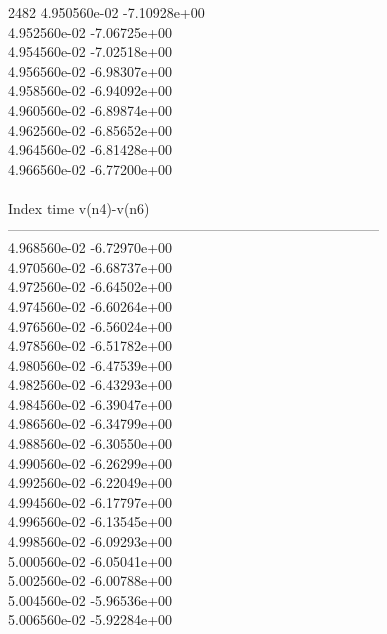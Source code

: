 2482	4.950560e-02	-7.10928e+00	\\ 	4.952560e-02	-7.06725e+00	\\ 	4.954560e-02	-7.02518e+00	\\ 	4.956560e-02	-6.98307e+00	\\ 	4.958560e-02	-6.94092e+00	\\ 	4.960560e-02	-6.89874e+00	\\ 	4.962560e-02	-6.85652e+00	\\ 	4.964560e-02	-6.81428e+00	\\ 	4.966560e-02	-6.77200e+00	\\ \hline
\\ \hline
Index   time            v(n4)-v(n6)     \\ \hline
--------------------------------------------------------------------------------\\ 	4.968560e-02	-6.72970e+00	\\ 	4.970560e-02	-6.68737e+00	\\ 	4.972560e-02	-6.64502e+00	\\ 	4.974560e-02	-6.60264e+00	\\ 	4.976560e-02	-6.56024e+00	\\ 	4.978560e-02	-6.51782e+00	\\ 	4.980560e-02	-6.47539e+00	\\ 	4.982560e-02	-6.43293e+00	\\ 	4.984560e-02	-6.39047e+00	\\ 	4.986560e-02	-6.34799e+00	\\ 	4.988560e-02	-6.30550e+00	\\ 	4.990560e-02	-6.26299e+00	\\ 	4.992560e-02	-6.22049e+00	\\ 	4.994560e-02	-6.17797e+00	\\ 	4.996560e-02	-6.13545e+00	\\ 	4.998560e-02	-6.09293e+00	\\ 	5.000560e-02	-6.05041e+00	\\ 	5.002560e-02	-6.00788e+00	\\ 	5.004560e-02	-5.96536e+00	\\ 	5.006560e-02	-5.92284e+00	\\ \hline
